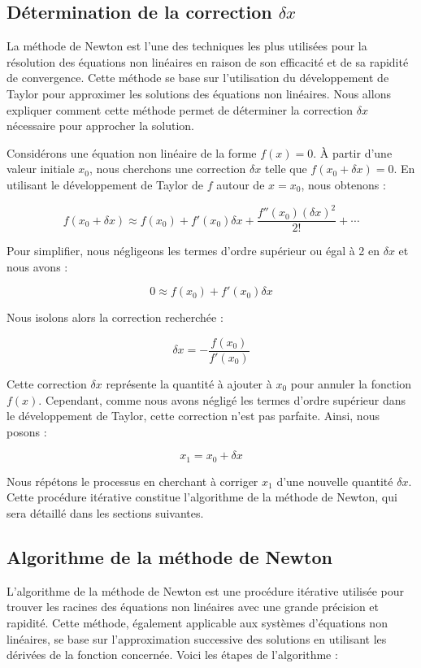 \documentclass{article}
\begin{document}
\subsection{Détermination de la correction \(\delta x\)}

La méthode de Newton est l'une des techniques les plus utilisées pour la résolution des équations non linéaires en raison de son efficacité et de sa rapidité de convergence. Cette méthode se base sur l'utilisation du développement de Taylor pour approximer les solutions des équations non linéaires. Nous allons expliquer comment cette méthode permet de déterminer la correction \(\delta x\) nécessaire pour approcher la solution.

Considérons une équation non linéaire de la forme \( f(x) = 0 \). À partir d'une valeur initiale \( x_0 \), nous cherchons une correction \(\delta x\) telle que \( f(x_0 + \delta x) = 0 \). En utilisant le développement de Taylor de \( f \) autour de \( x = x_0 \), nous obtenons :

\[
f(x_0 + \delta x) \approx f(x_0) + f'(x_0) \delta x + \frac{f''(x_0)(\delta x)^2}{2!} + \cdots
\]

Pour simplifier, nous négligeons les termes d'ordre supérieur ou égal à 2 en \(\delta x\) et nous avons :

\[
0 \approx f(x_0) + f'(x_0) \delta x
\]

Nous isolons alors la correction recherchée :

\[
\delta x = -\frac{f(x_0)}{f'(x_0)}
\]

Cette correction \(\delta x\) représente la quantité à ajouter à \( x_0 \) pour annuler la fonction \( f(x) \). Cependant, comme nous avons négligé les termes d'ordre supérieur dans le développement de Taylor, cette correction n'est pas parfaite. Ainsi, nous posons :

\[
x_1 = x_0 + \delta x
\]

Nous répétons le processus en cherchant à corriger \( x_1 \) d'une nouvelle quantité \(\delta x\). Cette procédure itérative constitue l'algorithme de la méthode de Newton, qui sera détaillé dans les sections suivantes.

\subsection{Algorithme de la méthode de Newton}

L'algorithme de la méthode de Newton est une procédure itérative utilisée pour trouver les racines des équations non linéaires avec une grande précision et rapidité. Cette méthode, également applicable aux systèmes d'équations non linéaires, se base sur l'approximation successive des solutions en utilisant les dérivées de la fonction concernée. Voici les étapes de l'algorithme :
\end{document}
